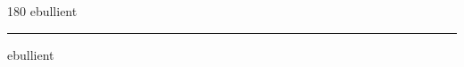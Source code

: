 
\begin{frame}
\begin{center}
\begin{turn}{180}
{\fontsize{2.5cm}{1em}\selectfont ebullient}
\end{turn}
\vspace{1em}\par  
\hrule
\vspace{1em}\par  
{\fontsize{2.5cm}{1em}\selectfont ebullient}
\end{center}
\end{frame}
